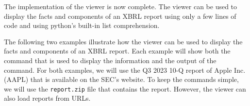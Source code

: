 The implementation of the viewer is now complete.
The viewer can be used to display the facts and components of an XBRL report using only a few lines of code and using python's built-in list comprehension.






The following two examples illustrate how the viewer can be used to display the facts and components of an XBRL report.
Each example will show both the command that is used to display the information and the output of the command.
For both examples, we will use the Q3 2023 10-Q report of Apple Inc. (AAPL) that is available on the SEC's website\cite{aapl_10q_2023_q3}.
To keep the commands simple, we will use the \texttt{report.zip} file that contains the report.
However, the viewer can also load reports from URLs.

